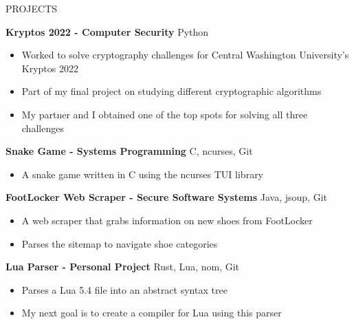 \documentclass{resume}
\begin{document}
\begin{rSection}{PROJECTS}
	\vspace{-1.25em}

	\item \textbf{Kryptos 2022 - Computer Security} \hfill {Python}\\
	\vspace{-1.25em}
	\begin{itemize}
		\setlength{\itemsep}{-3pt}
		\item Worked to solve cryptography challenges for Central Washington University's Kryptos 2022
		\item Part of my final project on studying different cryptographic algorithms
		\item My partner and I obtained one of the top spots for solving all three challenges
	\end{itemize}

	\item \textbf{Snake Game - Systems Programming} \hfill {C, ncurses, Git}\\
	\vspace{-1.25em}
	\begin{itemize}
		\setlength{\itemsep}{-3pt}
		\item A snake game written in C using the ncurses TUI library
	\end{itemize}

\item \textbf{FootLocker Web Scraper - Secure Software Systems} \hfill {Java, jsoup, Git}\\
	\vspace{-1.25em}
	\begin{itemize}
		\setlength{\itemsep}{-3pt}
		\item A web scraper that grabs information on new shoes from FootLocker
		\item Parses the sitemap to navigate shoe categories
	\end{itemize}

	\item \textbf{Lua Parser - Personal Project} \hfill {Rust, Lua, nom, Git}\\
	\vspace{-1.25em}
	\begin{itemize}
		\setlength{\itemsep}{-3pt}
		\item Parses a Lua 5.4 file into an abstract syntax tree
		\item My next goal is to create a compiler for Lua using this parser
	\end{itemize}
\end{rSection}

\end{document}
